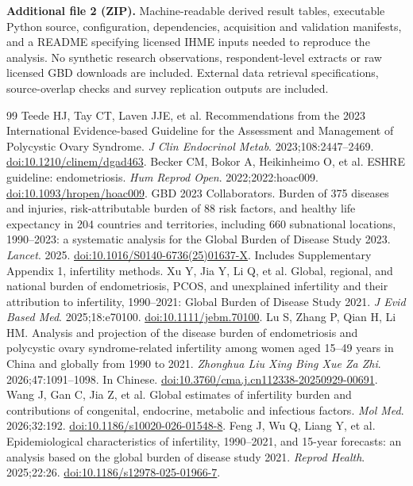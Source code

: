 \documentclass[11pt,a4paper]{article}
\begin{document}
\textbf{Additional file 2 (ZIP).} Machine-readable derived result tables, executable Python source, configuration, dependencies, acquisition and validation manifests, and a README specifying licensed IHME inputs needed to reproduce the analysis. No synthetic research observations, respondent-level extracts or raw licensed GBD downloads are included. External data retrieval specifications, source-overlap checks and survey replication outputs are included.
{\small\doublespacing
\begin{thebibliography}{99}
 Teede HJ, Tay CT, Laven JJE, et al. Recommendations from the 2023 International Evidence-based Guideline for the Assessment and Management of Polycystic Ovary Syndrome. \emph{J Clin Endocrinol Metab}. 2023;108:2447--2469. \href{https://doi.org/10.1210/clinem/dgad463}{doi:10.1210/clinem/dgad463}.
 Becker CM, Bokor A, Heikinheimo O, et al. ESHRE guideline: endometriosis. \emph{Hum Reprod Open}. 2022;2022:hoac009. \href{https://doi.org/10.1093/hropen/hoac009}{doi:10.1093/hropen/hoac009}.
 GBD 2023 Collaborators. Burden of 375 diseases and injuries, risk-attributable burden of 88 risk factors, and healthy life expectancy in 204 countries and territories, including 660 subnational locations, 1990--2023: a systematic analysis for the Global Burden of Disease Study 2023. \emph{Lancet}. 2025. \href{https://doi.org/10.1016/S0140-6736(25)01637-X}{doi:10.1016/S0140-6736(25)01637-X}. Includes Supplementary Appendix 1, infertility methods.
 Xu Y, Jia Y, Li Q, et al. Global, regional, and national burden of endometriosis, PCOS, and unexplained infertility and their attribution to infertility, 1990--2021: Global Burden of Disease Study 2021. \emph{J Evid Based Med}. 2025;18:e70100. \href{https://doi.org/10.1111/jebm.70100}{doi:10.1111/jebm.70100}.
 Lu S, Zhang P, Qian H, Li HM. Analysis and projection of the disease burden of endometriosis and polycystic ovary syndrome-related infertility among women aged 15--49 years in China and globally from 1990 to 2021. \emph{Zhonghua Liu Xing Bing Xue Za Zhi}. 2026;47:1091--1098. In Chinese. \href{https://doi.org/10.3760/cma.j.cn112338-20250929-00691}{doi:10.3760/cma.j.cn112338-20250929-00691}.
 Wang J, Gan C, Jia Z, et al. Global estimates of infertility burden and contributions of congenital, endocrine, metabolic and infectious factors. \emph{Mol Med}. 2026;32:192. \href{https://doi.org/10.1186/s10020-026-01548-8}{doi:10.1186/s10020-026-01548-8}.
 Feng J, Wu Q, Liang Y, et al. Epidemiological characteristics of infertility, 1990--2021, and 15-year forecasts: an analysis based on the global burden of disease study 2021. \emph{Reprod Health}. 2025;22:26. \href{https://doi.org/10.1186/s12978-025-01966-7}{doi:10.1186/s12978-025-01966-7}.

\end{thebibliography}}
\end{document}
